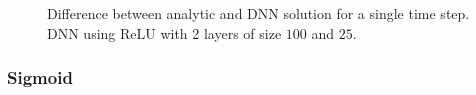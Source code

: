 \documentclass{article}
\theoremstyle{definition}
\begin{document}
\begin{figure}[H]
    \centering
    \qquad
    \caption{Difference between analytic and DNN solution for a single time step. DNN using ReLU with 2 layers of size $100$ and $25$.}
    \label{fig:diff_DNN_ReLU_single_step}
\end{figure}

\subsubsection{Sigmoid}
\end{document}
